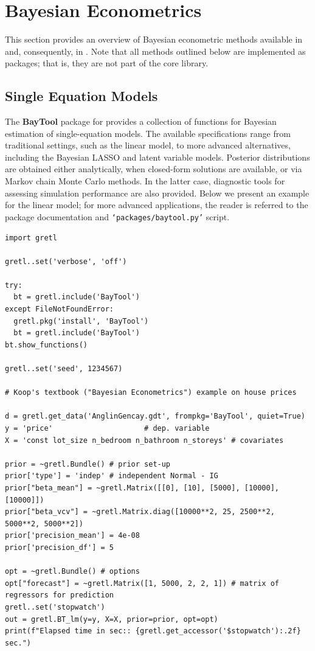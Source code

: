 \section{Bayesian Econometrics}
This section provides an overview of Bayesian
econometric methods available in \gretl and,
consequently, in \gretlpy. Note that all methods
outlined below are implemented as \gretl packages;
that is, they are not part of the core \lgretl library.


\subsection{Single Equation Models}
The \textbf{BayTool} package \cite[see][]{BayTool_CS}
for \gretl provides a collection of functions for Bayesian
estimation of single-equation models. The available
specifications range from traditional settings, such
as the linear model, to more advanced alternatives,
including the Bayesian LASSO and latent variable models.
Posterior distributions are obtained either analytically,
when closed-form solutions are available, or via Markov
chain Monte Carlo methods. In the latter case, diagnostic
tools for assessing simulation performance are also provided.
Below we present an example for the linear model; for more
advanced applications, the reader is referred to the package
documentation and \texttt{`packages/baytool.py'} script.
\begin{lstlisting}[style=pythonstylefoot]
import gretl

gretl..set('verbose', 'off')

try:
  bt = gretl.include('BayTool')
except FileNotFoundError:
  gretl.pkg('install', 'BayTool')
  bt = gretl.include('BayTool')
bt.show_functions()

gretl..set('seed', 1234567)

# Koop's textbook ("Bayesian Econometrics") example on house prices

d = gretl.get_data('AnglinGencay.gdt', frompkg='BayTool', quiet=True)
y = 'price'					    # dep. variable
X = 'const lot_size n_bedroom n_bathroom n_storeys' # covariates

prior = ~gretl.Bundle() # prior set-up
prior['type'] = 'indep' # independent Normal - IG
prior["beta_mean"] = ~gretl.Matrix([[0], [10], [5000], [10000], [10000]])
prior["beta_vcv"] = ~gretl.Matrix.diag([10000**2, 25, 2500**2, 5000**2, 5000**2])
prior['precision_mean'] = 4e-08
prior['precision_df'] = 5

opt = ~gretl.Bundle() # options
opt["forecast"] = ~gretl.Matrix([1, 5000, 2, 2, 1]) # matrix of regressors for prediction
gretl..set('stopwatch')
out = gretl.BT_lm(y=y, X=X, prior=prior, opt=opt)
print(f"Elapsed time in sec:: {gretl.get_accessor('$stopwatch'):.2f} sec.")
\end{lstlisting}%


